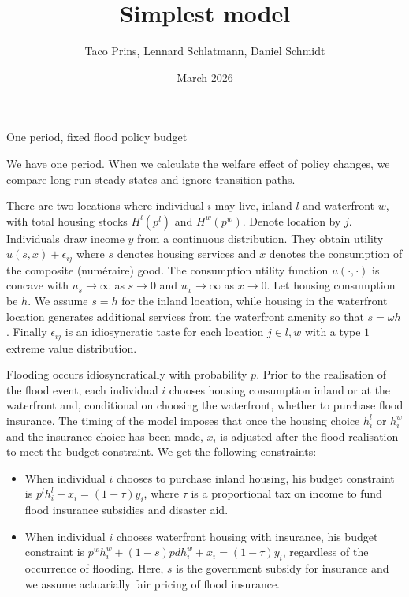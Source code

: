 \documentclass{article}
\title{Simplest model}
\author{Taco Prins, Lennard Schlatmann, Daniel Schmidt}
\date{March 2026}
\begin{document}
\begin{section}{One period, fixed flood policy budget}

We have one period. When we calculate the welfare effect of policy changes, we compare long-run steady states and ignore transition paths. 

\vspace{\baselineskip}

There are two locations where individual $i$ may live, inland $l$ and waterfront $w$, with total housing stocks $H^l(p^l)$ and $H^w(p^w)$. Denote location by $j$. Individuals draw income $y$ from a continuous distribution. They obtain utility $u(s,x)+\epsilon_{ij}$ where $s$ denotes housing services and $x$ denotes the consumption of the composite (numéraire) good. The consumption utility function $u(\cdot,\cdot)$ is concave with $u_s\rightarrow\infty$ as $s\rightarrow0$ and $u_x\rightarrow\infty$ as $x\rightarrow0$. Let housing consumption be $h$. We assume $s=h$ for the inland location, while housing in the waterfront location generates additional services from the waterfront amenity so that $s=\omega h$. Finally $\epsilon_{ij}$ is an idiosyncratic taste for each location $j\in{l,w}$ with a type $1$ extreme value distribution.

\vspace{\baselineskip}

Flooding occurs idiosyncratically with probability $p$. Prior to the realisation of the flood event, each individual $i$ chooses housing consumption inland or at the waterfront and, conditional on choosing the waterfront, whether to purchase flood insurance. The timing of the model imposes that once the housing choice $h^l_i$ or $h^w_i$ and the insurance choice has been made, $x_i$ is adjusted after the flood realisation to meet the budget constraint.  We get the following constraints:

\begin{itemize}

\item When individual $i$ chooses to purchase inland housing, his budget constraint is $p^lh^l_i+x_i=(1-\tau)y_i$, where $\tau$ is a proportional tax on income to fund flood insurance subsidies and disaster aid. 

\item When individual $i$ chooses waterfront housing with insurance, his budget constraint is $p^wh^w_i+(1-s)pdh^w_i+x_i=(1-\tau)y_i$, regardless of the occurrence of flooding. Here, $s$ is the government subsidy for insurance and we assume actuarially fair pricing of flood insurance. 


\end{itemize}
\end{section}
\end{document}
